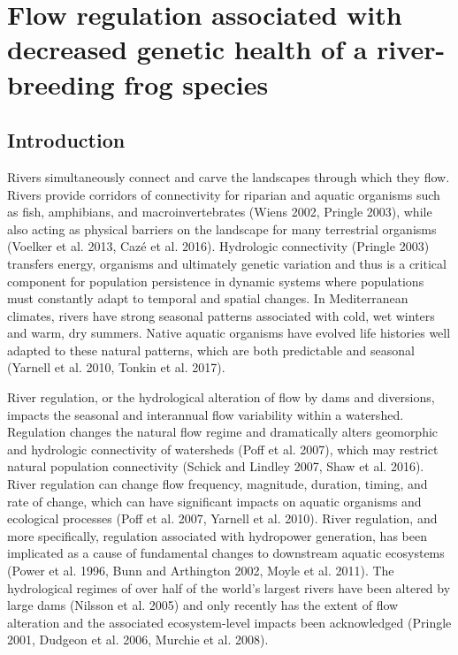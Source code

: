 \documentclass[twoside,12pt,final]{ucthesis-CA2012}
\begin{document}
\begin{ucmainmatter}

\pagestyle{plain}

\hypertarget{reg-health}{%
\chapter{Flow regulation associated with decreased genetic health of a
river-breeding frog species}\label{reg-health}}

\hypertarget{introduction}{%
\section{Introduction}\label{introduction}}

Rivers simultaneously connect and carve the landscapes through which
they flow. Rivers provide corridors of connectivity for riparian and
aquatic organisms such as fish, amphibians, and macroinvertebrates
(Wiens 2002, Pringle 2003), while also acting as physical barriers on
the landscape for many terrestrial organisms (Voelker et al. 2013, Cazé
et al. 2016). Hydrologic connectivity (Pringle 2003) transfers energy,
organisms and ultimately genetic variation and thus is a critical
component for population persistence in dynamic systems where
populations must constantly adapt to temporal and spatial changes. In
Mediterranean climates, rivers have strong seasonal patterns associated
with cold, wet winters and warm, dry summers. Native aquatic organisms
have evolved life histories well adapted to these natural patterns,
which are both predictable and seasonal (Yarnell et al. 2010, Tonkin et
al. 2017).

River regulation, or the hydrological alteration of flow by dams and
diversions, impacts the seasonal and interannual flow variability within
a watershed. Regulation changes the natural flow regime and dramatically
alters geomorphic and hydrologic connectivity of watersheds (Poff et al.
2007), which may restrict natural population connectivity (Schick and
Lindley 2007, Shaw et al. 2016). River regulation can change flow
frequency, magnitude, duration, timing, and rate of change, which can
have significant impacts on aquatic organisms and ecological processes
(Poff et al. 2007, Yarnell et al. 2010). River regulation, and more
specifically, regulation associated with hydropower generation, has been
implicated as a cause of fundamental changes to downstream aquatic
ecosystems (Power et al. 1996, Bunn and Arthington 2002, Moyle et al.
2011). The hydrological regimes of over half of the world's largest
rivers have been altered by large dams (Nilsson et al. 2005) and only
recently has the extent of flow alteration and the associated
ecosystem-level impacts been acknowledged (Pringle 2001, Dudgeon et al.
2006, Murchie et al. 2008).


\end{ucmainmatter}
\end{document}
